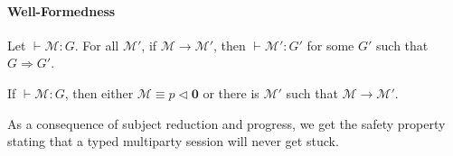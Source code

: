 



\paragraph{Well-Formedness}

\begin{theorem}
    Let \(\vdash \mathcal{M} : G\). For all \(\mathcal{M}'\), if \(\mathcal{M} \longrightarrow \mathcal{M}'\),
    then \(\vdash \mathcal{M}' : G'\) for some \(G'\) such that \(G \Longrightarrow G'\).
\end{theorem}

\begin{theorem}[Progress]
    If \(\vdash \mathcal{M} : G\), then either \(\mathcal{M} \equiv p \triangleleft \mathbf{0}\) 
    or there is \(\mathcal{M}'\) such that \(\mathcal{M} \longrightarrow \mathcal{M}'\).
\end{theorem}

As a consequence of subject reduction and progress, we get the safety property stating that a typed multiparty session will never get stuck.

